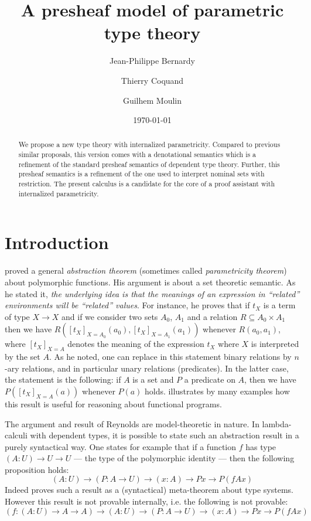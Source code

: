 \documentclass[english]{PaperTools/latex/lipics}
\title{A presheaf model of parametric type theory}
\author{Jean-Philippe Bernardy}
\author{Thierry Coquand}
\author{Guilhem Moulin}
\affil{Chalmers University of Technology and University of Gothenburg \\
\texttt{\{bernardy,coquand,mouling\}@chalmers.se}}
\date{\today}
\begin{document}
\maketitle

\begin{abstract}
  We propose a new type theory with internalized
  parametricity. Compared to previous similar proposals, this version
  comes with a denotational semantics which is a refinement of the
  standard presheaf semantics of dependent type theory. Further, this
  presheaf semantics is a refinement of the one used to interpret
  nominal sets with restriction.  The present calculus is a candidate for the
  core of a proof assistant with internalized parametricity.
\end{abstract}

\section{Introduction}
\cite{reynolds_types_1983} proved a general \emph{abstraction theorem} (sometimes called
\emph{parametricity theorem}) about polymorphic functions. His argument is
about a set theoretic semantic.  As he stated it, {\em the underlying
  idea is that the meanings of an expression in ``related''
  environments will be ``related'' values}.  For instance, he proves
that if $t_X$ is a term of type $X → X$ and if we consider two sets
$A_0$, $A_1$ and a relation $R ⊆ A_0 × A_1$ then we have
$R([t_X]_{X=A_0}(a_0),[t_X]_{X=A_1}(a_1))$ whenever $R(a_0,a_1)$,
where $[t_X]_{X=A}$ denotes the meaning of the expression $t_X$ where
$X$ is interpreted by the set $A$. As he noted, one can replace in
this statement binary relations by $n$-ary relations, and in particular
unary relations (predicates). In the latter case, the statement is the following:
if $A$ is a set and $P$ a predicate on $A$, then we have
$P([t_X]_{X=A}(a))$ whenever $P(a)$ holds.
\cite{wadler_theorems_1989} illustrates by many examples how this
result is useful for reasoning about functional programs.

The argument and result of Reynolds are model-theoretic in nature.
In lambda-calculi with dependent types, it is possible to state such an
abstraction result in a purely syntactical way.
One states for example that if a function $f$ has type
$(A : U) → U → U$ --- the type of the polymorphic identity --- then the
following proposition holds:
$$ (A : U) → (P : A → U) → (x : A) → P x → P (f A x) $$
%
Indeed \citet{bernardy_proofs_2012} proves such a result as a
(syntactical) meta-theorem about type systems. However this result is
not provable internally, i.e. the following is not provable:
$$ (f : (A:U) → A → A) →  (A : U) → (P : A → U) → (x : A) → P x → P (f A x) $$
\end{document}
